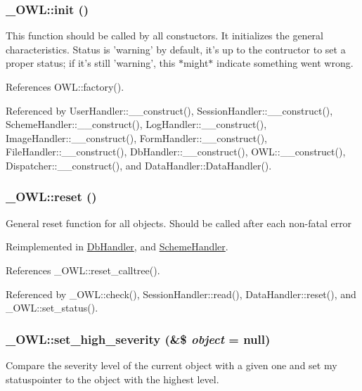 \subsubsection[{init}]{\setlength{\rightskip}{0pt plus 5cm}\_\-OWL::init ()}\label{class__OWL_ae0ef3ded56e8a6b34b6461e5a721cd3e}
This function should be called by all constuctors. It initializes the general characteristics. Status is 'warning' by default, it's up to the contructor to set a proper status; if it's still 'warning', this $\ast$might$\ast$ indicate something went wrong. 

References OWL::factory().



Referenced by UserHandler::\_\-\_\-construct(), SessionHandler::\_\-\_\-construct(), SchemeHandler::\_\-\_\-construct(), LogHandler::\_\-\_\-construct(), ImageHandler::\_\-\_\-construct(), FormHandler::\_\-\_\-construct(), FileHandler::\_\-\_\-construct(), DbHandler::\_\-\_\-construct(), OWL::\_\-\_\-construct(), Dispatcher::\_\-\_\-construct(), and DataHandler::DataHandler().

\subsubsection[{reset}]{\setlength{\rightskip}{0pt plus 5cm}\_\-OWL::reset ()}\label{class__OWL_a2f2a042bcf31965194c03033df0edc9b}
General reset function for all objects. Should be called after each non-\/fatal error 

Reimplemented in \hyperlink{classDbHandler_a9982df4830f05803935bb31bac7fae3d}{DbHandler}, and \hyperlink{classSchemeHandler_aa25feb4a70d67b3d571904be4b2f50bc}{SchemeHandler}.



References \_\-OWL::reset\_\-calltree().



Referenced by \_\-OWL::check(), SessionHandler::read(), DataHandler::reset(), and \_\-OWL::set\_\-status().

\subsubsection[{set\_\-high\_\-severity}]{\setlength{\rightskip}{0pt plus 5cm}\_\-OWL::set\_\-high\_\-severity (\&\$ {\em object} = {\ttfamily null})}\label{class__OWL_a576829692a3b66e3d518853bf43abae3}
Compare the severity level of the current object with a given one and set my statuspointer to the object with the highest level. 

